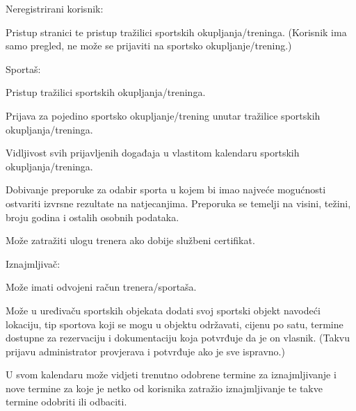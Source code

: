 	\begin{packed_item}
		\item{Neregistrirani korisnik:
			\begin{packed_item}
				\item{Pristup stranici te pristup tražilici sportskih okupljanja/treninga. 
					(Korisnik ima samo pregled, ne može se prijaviti na sportsko okupljanje/trening.)
				}
			\end{packed_item}
		}
	
		\item{Sportaš:
			\begin{packed_item}
				\item{Pristup tražilici sportskih okupljanja/treninga.}
				\item{Prijava za pojedino sportsko okupljanje/trening unutar tražilice sportskih okupljanja/treninga.
				}
				\item{Vidljivost svih prijavljenih događaja u vlastitom kalendaru sportskih okupljanja/treninga.
				}
				\item{Dobivanje preporuke za odabir sporta u kojem bi imao najveće mogućnosti ostvariti izvrsne
					rezultate na natjecanjima. Preporuka se temelji na visini, težini, broju godina i
					ostalih osobnih podataka.}
				\item{Može zatražiti ulogu trenera ako dobije službeni certifikat.
				}
			\end{packed_item}}
	
			\item{Iznajmljivač:
			\begin{packed_item}
				\item{Može imati odvojeni račun trenera/sportaša.}
				\item{Može u uređivaču sportskih objekata dodati svoj sportski objekt navodeći lokaciju, 
					tip sportova koji se mogu u objektu održavati, cijenu po satu, termine dostupne za rezervaciju i 
					dokumentaciju koja potvrđuje da je on vlasnik. (Takvu prijavu administrator provjerava i 
					potvrđuje ako je sve ispravno.)}
				\item{U svom kalendaru može vidjeti trenutno odobrene termine za iznajmljivanje i nove termine za koje
					je netko od korisnika zatražio iznajmljivanje te takve termine odobriti ili odbaciti.
				}
			\end{packed_item}}
		

\end{packed_item}
